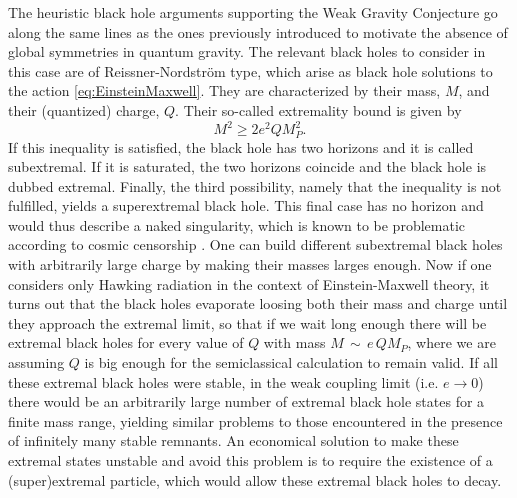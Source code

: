 \documentclass[11pt,a4paper]{article}
\begin{document}
The heuristic black hole arguments supporting the Weak Gravity Conjecture go along the same lines as the ones previously introduced to motivate the absence of global symmetries in quantum gravity. The relevant black holes to consider in this case are of Reissner-Nordstr\"om  type, which arise as black hole solutions to the action \eqref{eq:EinsteinMaxwell}. They are characterized by their mass, $M$, and their (quantized) charge, $Q$. Their so-called extremality bound is given by
\begin{equation}
M^2 \geq 2 e^2 Q M_{P}^2.
\end{equation}
If this inequality is satisfied, the black hole has two horizons and it is called subextremal. If it is saturated, the two horizons coincide and the black hole is dubbed extremal. Finally, the third possibility, namely that the inequality is not fulfilled, yields a superextremal black hole. This final case has no horizon and would thus describe a naked singularity, which is known to be problematic according to cosmic censorship \cite{Penrose:1969pc}. 
One can build different subextremal black holes with arbitrarily large charge by making their masses larges enough. Now if one considers only Hawking radiation in the context of Einstein-Maxwell theory, it turns out that the black holes evaporate loosing both their mass and charge until they approach the extremal limit, so that if we wait long enough there will be extremal black holes for every value of $Q$ with mass $M  \, \sim \, e \, Q M_{P}$, where we are assuming $Q$ is big enough for the semiclassical calculation to remain valid. If all these extremal black holes were stable, in the weak coupling limit (i.e. $e \rightarrow 0$) there would be an arbitrarily large number of extremal black hole states for a finite mass range, yielding similar problems to those encountered in the presence of infinitely many stable remnants. An economical solution to make these extremal states unstable and avoid this problem is to require the existence of a (super)extremal particle, which would allow these extremal black holes to decay. 
\end{document}
